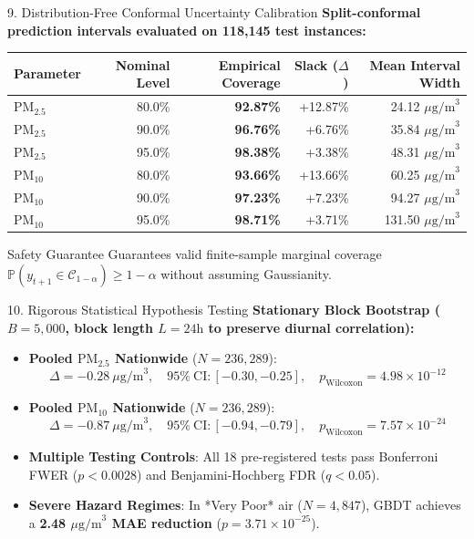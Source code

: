 \documentclass[aspectratio=169]{beamer}
\begin{document}
\begin{frame}{9. Distribution-Free Conformal Uncertainty Calibration}
  \textbf{Split-conformal prediction intervals evaluated on 118,145 test instances:}
  \begin{table}
    \centering
    \small
    \begin{tabular}{lrrrr}
      \toprule
      \textbf{Parameter} & \textbf{Nominal Level} & \textbf{Empirical Coverage} & \textbf{Slack ($\Delta$)} & \textbf{Mean Interval Width} \\
      \midrule
      $\text{PM}_{2.5}$ & 80.0\% & \textbf{92.87\%} & +12.87\% & 24.12 $\mu\text{g/m}^3$ \\
      $\text{PM}_{2.5}$ & 90.0\% & \textbf{96.76\%} & +6.76\% & 35.84 $\mu\text{g/m}^3$ \\
      $\text{PM}_{2.5}$ & 95.0\% & \textbf{98.38\%} & +3.38\% & 48.31 $\mu\text{g/m}^3$ \\
      \midrule
      $\text{PM}_{10}$  & 80.0\% & \textbf{93.66\%} & +13.66\% & 60.25 $\mu\text{g/m}^3$ \\
      $\text{PM}_{10}$  & 90.0\% & \textbf{97.23\%} & +7.23\% & 94.27 $\mu\text{g/m}^3$ \\
      $\text{PM}_{10}$  & 95.0\% & \textbf{98.71\%} & +3.71\% & 131.50 $\mu\text{g/m}^3$ \\
      \bottomrule
    \end{tabular}
  \end{table}
  \begin{block}{Safety Guarantee}
    Guarantees valid finite-sample marginal coverage $\mathbb{P}(y_{t+1} \in \mathcal{C}_{1-\alpha}) \ge 1-\alpha$ without assuming Gaussianity.
  \end{block}
\end{frame}

\begin{frame}{10. Rigorous Statistical Hypothesis Testing}
  \textbf{Stationary Block Bootstrap ($B=5,000$, block length $L=24\text{h}$ to preserve diurnal correlation):}
  \begin{itemize}
    \item \textbf{Pooled $\text{PM}_{2.5}$ Nationwide} ($N=236,289$):
      $$\Delta = -0.28\ \mu\text{g/m}^3,\quad 95\%\ \text{CI}: [-0.30, -0.25],\quad p_{\text{Wilcoxon}} = 4.98 \times 10^{-12}$$
    \item \textbf{Pooled $\text{PM}_{10}$ Nationwide} ($N=236,289$):
      $$\Delta = -0.87\ \mu\text{g/m}^3,\quad 95\%\ \text{CI}: [-0.94, -0.79],\quad p_{\text{Wilcoxon}} = 7.57 \times 10^{-24}$$
    \item \textbf{Multiple Testing Controls}: All 18 pre-registered tests pass Bonferroni FWER ($p < 0.0028$) and Benjamini-Hochberg FDR ($q < 0.05$).
    \item \textbf{Severe Hazard Regimes}: In *Very Poor* air ($N=4,847$), GBDT achieves a \textbf{2.48 $\mu\text{g/m}^3$ MAE reduction} ($p = 3.71 \times 10^{-25}$).
  \end{itemize}
\end{frame}
\end{document}
